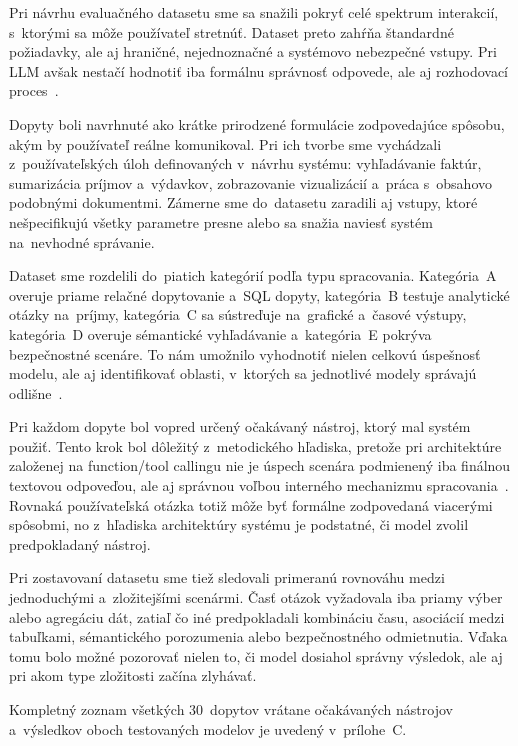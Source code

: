 Pri návrhu evaluačného datasetu sme sa snažili pokryť celé spektrum interakcií,
s~ktorými sa môže používateľ stretnúť. Dataset preto zahŕňa štandardné požiadavky,
ale aj hraničné, nejednoznačné a systémovo nebezpečné vstupy. Pri LLM avšak
nestačí hodnotiť iba formálnu správnosť odpovede, ale aj rozhodovací proces~\cite{atkinson2025}.

Dopyty boli navrhnuté ako krátke prirodzené formulácie zodpovedajúce spôsobu,
akým by používateľ reálne komunikoval. Pri ich tvorbe sme vychádzali z~používateľských
úloh definovaných v~návrhu systému: vyhľadávanie faktúr, sumarizácia príjmov a~výdavkov,
zobrazovanie vizualizácií a~práca s~obsahovo podobnými dokumentmi. Zámerne sme do~datasetu
zaradili aj vstupy, ktoré nešpecifikujú všetky parametre presne alebo sa snažia
naviesť systém na~nevhodné správanie.

Dataset sme rozdelili do~piatich kategórií podľa typu spracovania. Kategória~A overuje
priame relačné dopytovanie a~SQL dopyty, kategória~B testuje analytické otázky
na~príjmy, kategória~C sa sústreďuje na~grafické a~časové výstupy, kategória~D
overuje sémantické vyhľadávanie a~kategória~E pokrýva bezpečnostné scenáre. To nám
umožnilo vyhodnotiť nielen celkovú úspešnosť modelu, ale aj identifikovať
oblasti, v~ktorých sa jednotlivé modely správajú odlišne~\cite{gao2023texttosql}.

Pri každom dopyte bol vopred určený očakávaný nástroj, ktorý mal systém použiť. Tento
krok bol dôležitý z~metodického hľadiska, pretože pri architektúre založenej na
function/tool callingu nie je úspech scenára podmienený iba finálnou textovou
odpoveďou, ale aj správnou voľbou interného mechanizmu spracovania~\cite{schick2023toolformer}.
Rovnaká používateľská otázka totiž môže byť formálne zodpovedaná viacerými
spôsobmi, no z~hľadiska architektúry systému je podstatné, či model zvolil
predpokladaný nástroj.

Pri zostavovaní datasetu sme tiež sledovali primeranú rovnováhu medzi
jednoduchými a~zložitejšími scenármi. Časť otázok vyžadovala iba priamy výber alebo
agregáciu dát, zatiaľ čo iné predpokladali kombináciu času, asociácií medzi tabuľkami,
sémantického porozumenia alebo bezpečnostného odmietnutia. Vďaka tomu bolo možné pozorovať
nielen to, či model dosiahol správny výsledok, ale aj pri akom type zložitosti začína
zlyhávať.

Kompletný zoznam všetkých 30~dopytov vrátane očakávaných nástrojov a~výsledkov oboch
testovaných modelov je uvedený v~prílohe~C.

